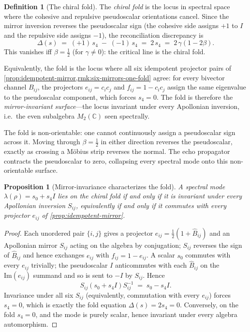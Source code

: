 \documentclass[11pt,a4paper]{article}
\theoremstyle{plain}
\newtheorem{proposition}[theorem]{Proposition}
\theoremstyle{definition}
\newtheorem{definition}[theorem]{Definition}
\theoremstyle{remark}
\numberwithin{equation}{section}
\begin{document}
\begin{definition}[The chiral fold]
\label{def:chiral-fold}
The \emph{chiral fold} is the locus in spectral space where the
cohesive and repulsive pseudoscalar orientations cancel.  Since the
mirror inversion reverses the pseudoscalar sign (the cohesive side
assigns \(+1\) to \(I\) and the repulsive side assigns \(-1\)),
the reconciliation discrepancy is
\[
  \Delta(s) \;=\; (+1)\,s_4 \;-\; (-1)\,s_4 \;=\; 2\,s_4
  \;=\; 2\,\gamma(1-2\beta).
\]
This vanishes iff \(\beta=\tfrac12\) (for \(\gamma\ne0\)): the critical
line is the chiral fold.

Equivalently, the fold is the locus where all six idempotent projector
pairs of \cref{prop:idempotent-mirror,rmk:six-mirrors-one-fold} agree:
for every bivector channel \(B_{ij}\), the projectors \(e_{ij}=c_ic_j\)
and \(f_{ij}=1-c_ic_j\) assign the same eigenvalue to the pseudoscalar
component, which forces \(s_4=0\).  The fold is therefore the
\emph{mirror-invariant surface}---the locus invariant under every
Apollonian inversion, i.e.\ the even subalgebra
\(M_2(\mathbb{C})\) seen spectrally.

The fold is non-orientable: one cannot continuously assign a
pseudoscalar sign across it.  Moving through \(\beta=\tfrac12\) in
either direction reverses the pseudoscalar, exactly as crossing a
M\"obius strip reverses the normal.  The echo propagator contracts the
pseudoscalar to zero, collapsing every spectral mode onto this
non-orientable surface.
\end{definition}

\begin{proposition}[Mirror-invariance characterizes the fold]
\label{prop:fold-mirror-invariance}
A spectral mode \(\lambda(\rho)=s_0+s_4 I\) lies on the chiral fold if
and only if it is invariant under every Apollonian inversion
\(S_{ij}\), equivalently if and only if it commutes with every
projector \(e_{ij}\) of \cref{prop:idempotent-mirror}.
\end{proposition}

\begin{proof}
Each unordered pair \(\{i,j\}\) gives a projector
\(e_{ij}=\tfrac12(1+\hat B_{ij})\) and an Apollonian mirror
\(S_{ij}\) acting on the algebra by conjugation; \(S_{ij}\) reverses
the sign of \(\hat B_{ij}\) and hence exchanges \(e_{ij}\) with
\(f_{ij}=1-e_{ij}\).  A scalar \(s_0\) commutes with every \(e_{ij}\)
trivially; the pseudoscalar \(I\) anticommutes with each \(\hat B_{ij}\)
on the \(\mathrm{Im}(e_{ij})\) summand and so is sent to \(-I\) by
\(S_{ij}\).  Hence
\[
  S_{ij}(s_0+s_4 I)S_{ij}^{-1} \;=\; s_0-s_4 I.
\]
Invariance under all six \(S_{ij}\) (equivalently, commutation with
every \(e_{ij}\)) forces \(s_4=0\), which is exactly the fold equation
\(\Delta(s)=2s_4=0\).  Conversely, on the fold \(s_4=0\), and the mode
is purely scalar, hence invariant under every algebra automorphism.
\end{proof}
\end{document}

